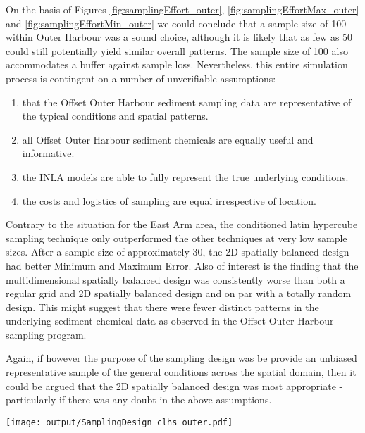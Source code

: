 \documentclass[a4paper]{article}
\let\origfigure=\figure
\let\endorigfigure=\endfigure
\renewenvironment{figure}[1][]{%
   \origfigure[H]
}{%
   \endorigfigure
}
\begin{document}
On the basis of Figures \ref{fig:samplingEffort_outer},
\ref{fig:samplingEffortMax_outer} and \ref{fig:samplingEffortMin_outer}
we could conclude that a sample size of 100 within Outer Harbour was a
sound choice, although it is likely that as few as 50 could still
potentially yield similar overall patterns. The sample size of 100 also
accommodates a buffer against sample loss. Nevertheless, this entire
simulation process is contingent on a number of unverifiable
assumptions:

\begin{enumerate}
\def\labelenumi{\arabic{enumi}.}
\tightlist
\item
  that the Offset Outer Harbour sediment sampling data are
  representative of the typical conditions and spatial patterns.
\item
  all Offset Outer Harbour sediment chemicals are equally useful and
  informative.
\item
  the INLA models are able to fully represent the true underlying
  conditions.
\item
  the costs and logistics of sampling are equal irrespective of
  location.
\end{enumerate}

Contrary to the situation for the East Arm area, the conditioned latin
hypercube sampling technique only outperformed the other techniques at
very low sample sizes. After a sample size of approximately 30, the 2D
spatially balanced design had better Minimum and Maximum Error. Also of
interest is the finding that the multidimensional spatially balanced
design was consistently worse than both a regular grid and 2D spatially
balanced design and on par with a totally random design. This might
suggest that there were fewer distinct patterns in the underlying
sediment chemical data as observed in the Offset Outer Harbour sampling
program.

Again, if however the purpose of the sampling design was be provide an
unbiased representative sample of the general conditions across the
spatial domain, then it could be argued that the 2D spatially balanced
design was most appropriate - particularly if there was any doubt in the
above assumptions.

\begin{figure}
\centering\scriptsize
\texttt{[image: output/SamplingDesign\_clhs\_outer.pdf]}
\caption{Sampling configurations associated with the lowest mean Error
for each sample size for cLHS for the Outer
Harbour\label{fig:SamplingDesign_clhs_outer}}
\end{figure}
\end{document}
